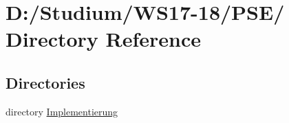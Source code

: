 \hypertarget{dir_D_3A_2FStudium_2FWS17_2D18_2FPSE_2F}{
\section{D:/Studium/WS17-18/PSE/ Directory Reference}
\label{dir_D_3A_2FStudium_2FWS17_2D18_2FPSE_2F}
}


\subsection*{Directories}
\begin{CompactItemize}
\item 
directory \hyperlink{dir_D_3A_2FStudium_2FWS17_2D18_2FPSE_2FImplementierung_2F}{Implementierung}
\end{CompactItemize}
